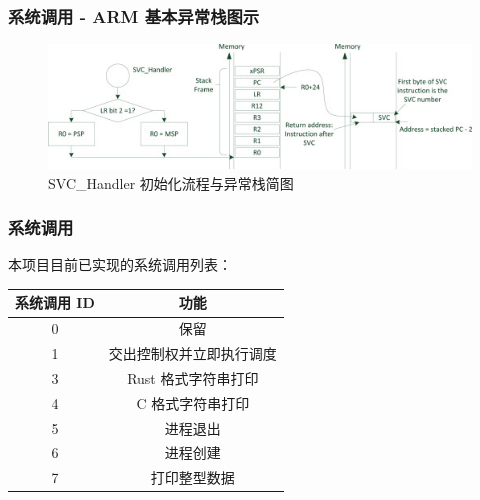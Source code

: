 \documentclass[aspectratio=169]{ctexbeamer}
\begin{document}
\begin{frame}

    \frametitle{系统调用 - ARM 基本异常栈图示}

    \begin{figure}
    \centering
        \captionsetup{font=song}
        \includegraphics{3-s2.0-B9780124080829000105-f10-05-9780124080829.jpg}
        \caption{SVC\_Handler 初始化流程与异常栈简图}
    \end{figure}

\end{frame}

\begin{frame}
    \frametitle{系统调用}

    本项目目前已实现的系统调用列表：

    \begin{center}
        \begin{tabular}{ |c|c| }
            \hline
            \textbf{系统调用 ID} & \textbf{功能} \\ \hline
            0 & 保留 \\
            1 & 交出控制权并立即执行调度 \\
            3 & Rust 格式字符串打印 \\ 
            4 & C 格式字符串打印 \\
            5 & 进程退出 \\
            6 & 进程创建 \\
            7 & 打印整型数据 \\ \hline
        \end{tabular}
    \end{center}
    
\end{frame}
\end{document}
